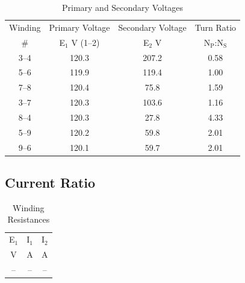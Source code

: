 \documentclass{article}
\begin{document}
\begin{table}[H]
  \centering
  \begin{tabular}{cccc}
    \hline
    Winding & Primary Voltage & Secondary Voltage & Turn Ratio \\
    \# & E$_1$ V (1--2) & E$_2$ V & N$_\text{P}$:N$_\text{S}$\\
    \hline
    3--4 & 120.3 & 207.2 & 0.58 \\
    5--6 & 119.9 & 119.4 & 1.00 \\
    7--8 & 120.4 &  75.8 & 1.59 \\
    3--7 & 120.3 & 103.6 & 1.16 \\
    8--4 & 120.3 &  27.8 & 4.33 \\
    5--9 & 120.2 &  59.8 & 2.01 \\
    9--6 & 120.1 &  59.7 & 2.01 \\
  \end{tabular}
  \caption{Primary and Secondary Voltages}
  \label{tab:volt_rat}
\end{table}

\subsection{Current Ratio}
\begin{table}[H]
  \centering
  \begin{tabular}{ccc}
    \hline
    E$_1$ & I$_1$ & I$_2$ \\
    V & A & A \\
    \hline
    -- & -- & -- \\
  \end{tabular}
  \caption{Winding Resistances}
  \label{tab:curr_rat}
\end{table}
\end{document}
